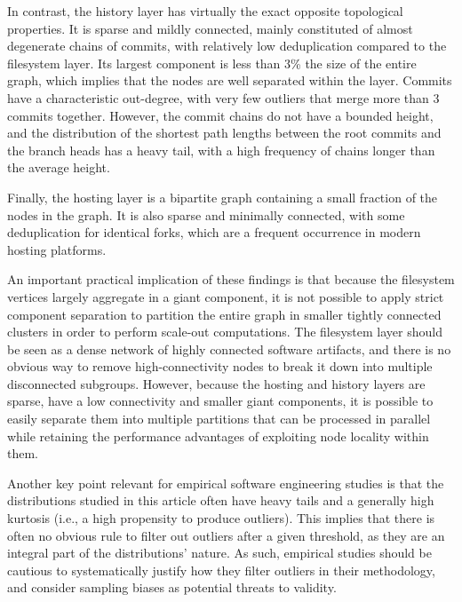 In contrast, the history layer has virtually the exact opposite topological
properties. It is sparse and mildly connected, mainly constituted of almost
degenerate chains of commits, with relatively low deduplication compared to the
filesystem layer. Its largest component is less than 3\% the size of the entire
graph, which implies that the nodes are well separated within the layer.
Commits have a characteristic out-degree, with very few outliers that merge
more than 3 commits together. However, the commit chains do not have a bounded
height, and the distribution of the shortest path lengths between the root
commits and the branch heads has a heavy tail, with a high frequency of chains
longer than the average height.

Finally, the hosting layer is a bipartite graph containing a small fraction of
the nodes in the graph. It is also sparse and minimally connected, with some
deduplication for identical forks, which are a frequent occurrence in modern
hosting platforms.

An important practical implication of these findings is that because the
filesystem vertices largely aggregate in a giant component, it is not possible
to apply strict component separation to partition the entire graph in smaller
tightly connected clusters in order to perform scale-out computations. The
filesystem layer should be seen as a dense network of highly connected software
artifacts, and there is no obvious way to remove high-connectivity nodes to
break it down into multiple disconnected subgroups.  However, because the
hosting and history layers are sparse, have a low connectivity and smaller
giant components, it is possible to easily separate them into multiple
partitions that can be processed in parallel while retaining the performance
advantages of exploiting node locality within them.

Another key point relevant for empirical software engineering studies is that
the distributions studied in this article often have heavy tails and a
generally high kurtosis (i.e., a high propensity to produce outliers). This
implies that there is often no obvious rule to filter out outliers after a
given threshold, as they are an integral part of the distributions' nature.  As
such, empirical studies should be cautious to systematically justify how they
filter outliers in their methodology, and consider sampling biases as potential
threats to validity.

